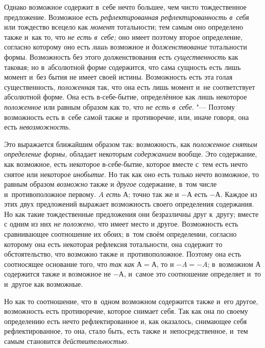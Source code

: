 Однако возможное содержит в~себе нечто большее, чем чисто тождественное
предложение. Возможное есть {\em рефлектированная
рефлектированность в~себя} или тождество всецело как
{\em момент} тотальности; тем самым оно определено
также и~как то, что {\em не есть в~себе;} оно имеет
поэтому второе определение, согласно которому оно есть
{\em лишь} возможное и
{\em долженствование} тотальности формы. Возможность
без этого долженствования есть {\em существенность} как
таковая; но в~абсолютной форме содержится, что сама сущность есть лишь
момент и~без бытия не имеет своей истины. Возможность есть эта голая
существенность, {\em положенная} так, что она есть лишь
момент и~не соответствует абсолютной форме. Она есть в-себе-бытие,
определённое как лишь некоторое {\em положенное} или
равным образом как то, что {\em не есть}
{\em в~себе}. "--- Поэтому возможность есть в~себе самой
также и~противоречие, или, иначе говоря, она есть {\em невозможность}.

Это выражается ближайшим образом так: возможность, как
{\em положенное снятым определение формы,} обладает
некоторым {\em содержанием} вообще. Это содержание, как
возможное, есть некоторое в-себе-бытие, которое вместе с~тем есть нечто
снятое или некоторое {\em инобытие}. Но так как оно
есть только нечто возможное, то равным образом
{\em возможно} также и {\em другое}
содержание, в~том числе и~противоположное первому. $A$ {\em есть}
$А$; точно так же и $-А$ есть $-А$. Каждое из этих двух
предложений выражает возможность своего определения содержания. Но как
такие тождественные предложения они безразличны друг к~другу; вместе с
одним из них {\em не положено,} что имеет место и
другое. Возможность есть сравнивающее соотношение их обоих; в~том своём
определении, согласно которому она есть некоторая рефлексия тотальности,
она содержит то обстоятельство, что возможно также и~противоположное.
Поэтому она есть соотносящее основание того, что
{\em так как} $А=А$, то и $-A=-A$; в~возможном $А$ содержится также и
возможное не $-А$, и~самое это соотношение определяет и~то и~другое
как возможные.

Но как то соотношение, что в~одном возможном содержится также и~его другое,
возможность есть противоречие, которое снимает себя. Так как она по своему
определению есть нечто рефлектированное и, как оказалось, снимающее себя
рефлектированное, то она, стало быть, есть также и~непосредственное, и~тем
самым становится {\em действительностью}.

